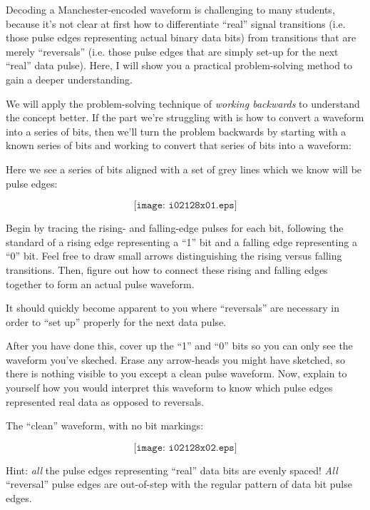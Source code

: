 

Decoding a Manchester-encoded waveform is challenging to many students, because it's not clear at first how to differentiate ``real'' signal transitions (i.e. those pulse edges representing actual binary data bits) from transitions that are merely ``reversals'' (i.e. those pulse edges that are simply set-up for the next ``real'' data pulse).  Here, I will show you a practical problem-solving method to gain a deeper understanding.

We will apply the problem-solving technique of {\it working backwards} to understand the concept better.  If the part we're struggling with is how to convert a waveform into a series of bits, then we'll turn the problem backwards by starting with a known series of bits and working to convert that series of bits into a waveform:

\vskip 10pt

Here we see a series of bits aligned with a set of grey lines which we know will be pulse edges:

$$\texttt{[image: i02128x01.eps]}$$

Begin by tracing the rising- and falling-edge pulses for each bit, following the standard of a rising edge representing a ``1'' bit and a falling edge representing a ``0'' bit.  Feel free to draw small arrows distinguishing the rising versus falling transitions.  Then, figure out how to connect these rising and falling edges together to form an actual pulse waveform.

It should quickly become apparent to you where ``reversals'' are necessary in order to ``set up'' properly for the next data pulse.

\vskip 10pt

After you have done this, cover up the ``1'' and ``0'' bits so you can only see the waveform you've skeched.  Erase any arrow-heads you might have sketched, so there is nothing visible to you except a clean pulse waveform.  Now, explain to yourself how you would interpret this waveform to know which pulse edges represented real data as opposed to reversals.








The ``clean'' waveform, with no bit markings:

$$\texttt{[image: i02128x02.eps]}$$

Hint: {\it all} the pulse edges representing ``real'' data bits are evenly spaced!  {\it All} ``reversal'' pulse edges are out-of-step with the regular pattern of data bit pulse edges.











